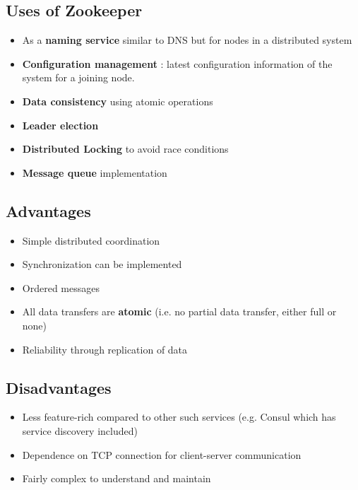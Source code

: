 \documentclass{article}
\begin{document}
\subsection{Uses of Zookeeper}
\begin{itemize}
    \item As a \textbf{naming service} similar to DNS but for nodes in a distributed system
    
    \item \textbf{Configuration management }: latest configuration information of the system for a joining node.
    
    \item \textbf{Data consistency} using atomic operations
    
    \item \textbf{Leader election} 
    
    \item \textbf{Distributed Locking} to avoid race conditions
    
    \item \textbf{Message queue} implementation
\end{itemize}

\subsection{Advantages}
\begin{itemize}
    \item Simple distributed coordination
    
    \item Synchronization can be implemented
    
    \item Ordered messages
    
    \item All data transfers are \textbf{atomic} (i.e. no partial data transfer, either full or none)
    
    \item Reliability through replication of data
\end{itemize}

\subsection{Disadvantages}
\begin{itemize}
    \item Less feature-rich compared to other such services (e.g. Consul which has service discovery included)
    
    \item Dependence on TCP connection for client-server communication
    
    \item Fairly complex to understand and maintain
\end{itemize}
\end{document}
